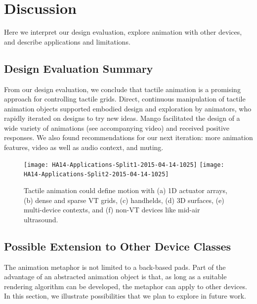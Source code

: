 \section{Discussion}
Here we interpret our design evaluation, explore animation with other devices, and describe applications and limitations.

\subsection{Design Evaluation Summary}
From our design evaluation, we conclude that tactile animation is a promising approach for controlling tactile grids.
Direct, continuous manipulation of tactile animation objects supported embodied design and exploration by animators, who rapidly iterated on designs to try new ideas.
Mango facilitated the design of a wide variety of animations (see accompanying video) and received positive responses.
We also found recommendations for our next iteration: more animation features, video as well as audio context, and muting.%

\begin{figure}[htb] %
   \centering
   \texttt{[image: HA14-Applications-Split1-2015-04-14-1025]} 
\qquad
   \texttt{[image: HA14-Applications-Split2-2015-04-14-1025]} 
      \caption{Tactile animation could define motion with (a) 1D actuator arrays, (b) dense and sparse VT grids, (c) handhelds, (d)  3D surfaces, (e) multi-device contexts, and  (f) non-VT devices like mid-air ultrasound.}
   \label{fig:application:space}
\end{figure}

\subsection{Possible Extension to Other Device Classes}
The animation metaphor is not limited to a back-based pads.
Part of the advantage of an abstracted animation object is that, 
as long as a suitable rendering algorithm can be developed, the metaphor can apply to other devices.
In this section, we illustrate possibilities that we plan to explore in future work.


